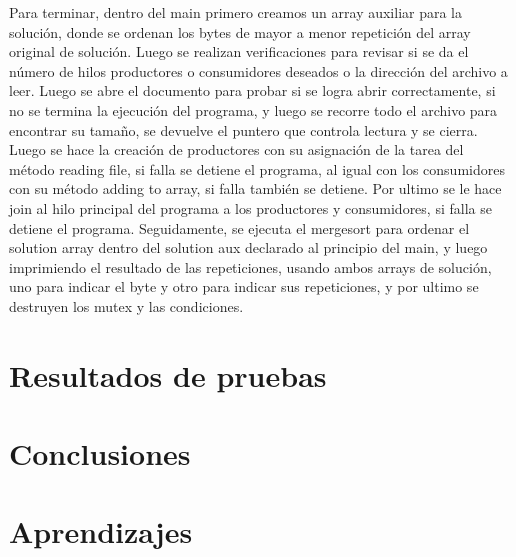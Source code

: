 \documentclass[10pt, article, natbib]{IEEEtran}
\begin{document}
Para terminar, dentro del main primero creamos un array auxiliar para la solución, donde se ordenan los bytes de mayor a menor repetición del array original de solución. Luego se realizan verificaciones para revisar si se da el número de hilos productores o consumidores deseados o la dirección del archivo a leer. Luego se abre el documento para probar si se logra abrir correctamente, si no se termina la ejecución del programa, y luego se recorre todo el archivo para encontrar su tamaño, se devuelve el puntero que controla lectura y se cierra. Luego se hace la creación de productores con su asignación de la tarea del método reading file, si falla se detiene el programa, al igual con los consumidores con su método adding to array, si falla también se detiene. Por ultimo se le hace join al hilo principal del programa a los productores y consumidores, si falla se detiene el programa.\cite{kerrisk_2010_pthread_join3} Seguidamente, se ejecuta el mergesort para ordenar el solution array dentro del solution aux declarado al principio del main, y luego imprimiendo el resultado de las repeticiones, usando ambos arrays de solución, uno para indicar el byte y otro para indicar sus repeticiones, y por ultimo se destruyen los mutex y las condiciones.\\

\section{Resultados de pruebas}

\section{Conclusiones}

\section{Aprendizajes}

\newpage
\onecolumn
 

\end{document}
